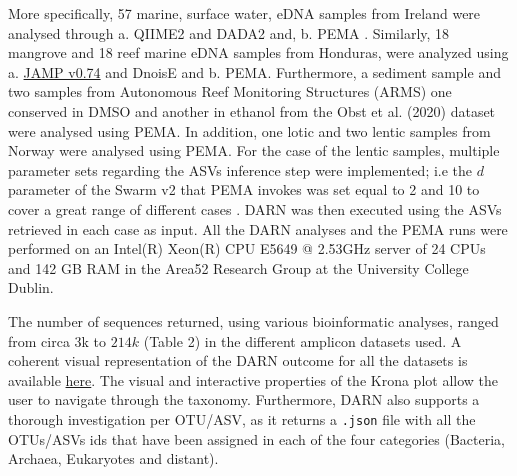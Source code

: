    More specifically, 57 marine, surface water, eDNA samples from Ireland were analysed through 
      a. QIIME2 \citep{bolyen2018qiime} and DADA2 \citep{callahan2016dada2} and, 
      b. PEMA \citep{zafeiropoulos2020pema}. 
   Similarly, 18 mangrove and 18 reef marine eDNA samples from Honduras, were analyzed using 
      a. \href{https://github.com/VascoElbrecht/JAMP}{JAMP v0.74} and DnoisE \citep{antich2021denoise} and 
      b. PEMA. 
   Furthermore, a sediment sample and two samples from Autonomous Reef Monitoring Structures (ARMS) one conserved in DMSO and another in ethanol from the Obst et al. (2020) \citep{obst2020marine} dataset were analysed using PEMA. 
   In addition, one lotic and two lentic samples from Norway were analysed using PEMA. 
   For the case of the lentic samples, multiple parameter sets regarding the ASVs inference step were implemented; 
   i.e the $d$ parameter of the Swarm v2 \citep{mahe2015swarm} that PEMA invokes was set equal to 2 and 10 to cover 
   a great range of different cases \citep{kamenova2020flexible}. 
   DARN was then executed using the ASVs retrieved in each case as input. 
   All the DARN analyses and the PEMA runs were performed on an Intel(R) Xeon(R) CPU E5649 @ 2.53GHz server of 24 CPUs and 142 GB RAM in the Area52 Research Group at the University College Dublin.

   The number of sequences returned, using various bioinformatic analyses, ranged from circa 3k to $214k$ (Table 2) in the different amplicon datasets used. 
   A coherent visual representation of the DARN outcome for all the datasets is 
   available \href{https://hariszaf.github.io/darn/}{here}. 
   The visual and interactive properties of the Krona plot allow the user to navigate through the taxonomy. 
   Furthermore, DARN also supports a thorough investigation per OTU/ASV, as it returns a \texttt{.json} file with 
   all the OTUs/ASVs ids that have been assigned in each of the four categories (Bacteria, Archaea, Eukaryotes and distant).
   
